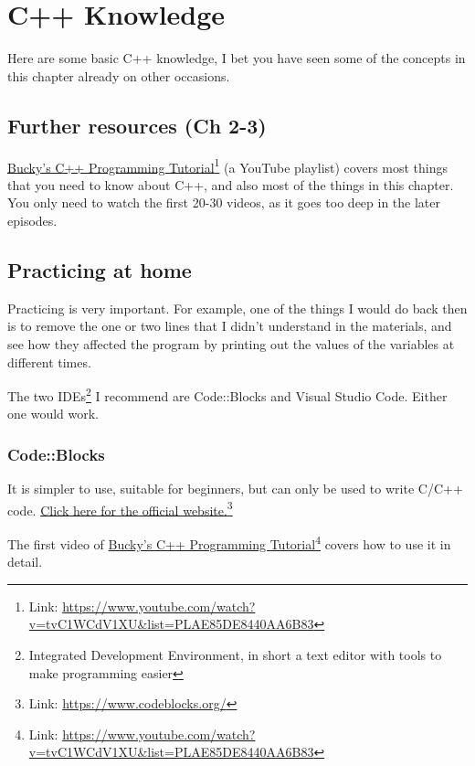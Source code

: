 \chapter{C++ Knowledge}

Here are some basic C++ knowledge, I bet you have seen some of the concepts in this chapter already on other occasions.

\section{Further resources (Ch 2-3)}
\href{https://www.youtube.com/watch?v=tvC1WCdV1XU&list=PLAE85DE8440AA6B83}{Bucky's C++ Programming Tutorial}\footnote{Link: \href{https://www.youtube.com/watch?v=tvC1WCdV1XU&list=PLAE85DE8440AA6B83}{https://www.youtube.com/watch?v=tvC1WCdV1XU\&list=PLAE85DE8440AA6B83}} (a YouTube playlist) covers most things that you need to know about C++, and also most of the things in this chapter. You only need to watch the first 20-30 videos, as it goes too deep in the later episodes.

\section{Practicing at home}
Practicing is very important. For example, one of the things I would do back then is to remove the one or two lines that I didn't understand in the materials, and see how they affected the program by printing out the values of the variables at different times. 

The two IDEs\footnote{Integrated Development Environment, in short a text editor with tools to make programming easier} I recommend are Code::Blocks and Visual Studio Code. Either one would work.

\subsection*{Code::Blocks}

It is simpler to use, suitable for beginners, but can only be used to write C/C++ code. \href{https://www.codeblocks.org/}{Click here for the official website.}\footnote{Link: \href{https://www.codeblocks.org/}{https://www.codeblocks.org/}}

The first video of \href{https://www.youtube.com/watch?v=tvC1WCdV1XU&list=PLAE85DE8440AA6B83}{Bucky's C++ Programming Tutorial}\footnote{Link: \href{https://www.youtube.com/watch?v=tvC1WCdV1XU&list=PLAE85DE8440AA6B83}{https://www.youtube.com/watch?v=tvC1WCdV1XU\&list=PLAE85DE8440AA6B83}} covers how to use it in detail.

